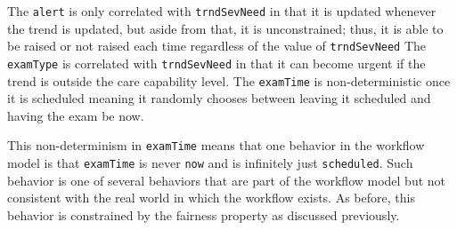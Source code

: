 \begin{comment}
The workflow itself has state not just for where the tokens are located as discussed is \secref{sec:bpmn}.
It makes decisions at different points based on the values of \texttt{alert}, \texttt{examType}, and \texttt{examTime}.
Their values are updated by their associated tasks in the workflow, but how the values evolve over time is not specified.
As such, they are modeled as inputs provided by the environment which are sampled when their associated tasks are activated.
\end{comment}

The \texttt{alert} is only correlated with \texttt{trndSevNeed} in that it is updated whenever the trend is updated, but aside from that, it is unconstrained;
thus, it is able to be raised or not raised each time regardless of the value of \texttt{trndSevNeed}
The \texttt{examType} is correlated with \texttt{trndSevNeed} in that it can become urgent if the trend is outside the care capability level.
The \texttt{examTime} is non-deterministic once it is scheduled meaning it randomly chooses between leaving it scheduled and having the exam be now.

This non-determinism in \texttt{examTime} means that one behavior in the workflow model is that \texttt{examTime} is never \texttt{now} and is infinitely just \texttt{scheduled}.
Such behavior is one of several behaviors that are part of the workflow model but not consistent with the real world in which the workflow exists.
As before, this behavior is constrained by the fairness property as discussed previously.
